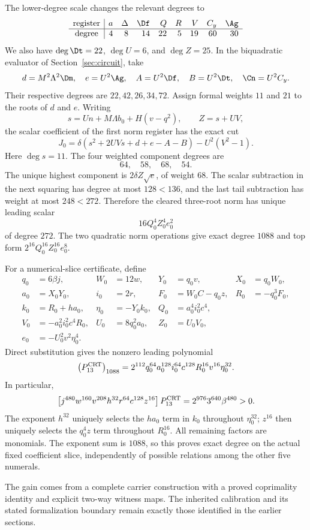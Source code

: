 The lower-degree scale changes the relevant degrees to
\[
\begin{array}{c|rrrrrrrr}
\text{register}&a&\Delta&\Df&Q&R&V&C_y&\Ag\\\hline
\text{degree}&4&8&14&22&5&19&60&30
\end{array}
\]
We also have \(\deg\Dt=22\), \(\deg U=6\), and
\(\deg Z=25\). In the biquadratic evaluator of
Section~\ref{sec:circuit}, take
\[
d=M^2\Lambda^2\Dm,\quad e=U^2\Ag,\quad
A=U^2\Df,\quad B=U^2\Dt,\quad \Cn=U^2C_y.
\]
Their respective degrees are \(22,42,26,34,72\). Assign formal
weights \(11\) and \(21\) to the roots of \(d\) and \(e\).
Writing
\[
s=Un+M\Lambda b_0+H(v-q^2),\qquad Z=s+UV,
\]
the scalar coefficient of the first norm register has the exact cut
\begin{equation}
J_0=\delta(s^2+2UVs+d+e-A-B)-U^2(V^2-1).
\label{eq:crtcut}
\end{equation}
Here \(\deg s=11\). The four weighted component degrees are
\[
64,\quad58,\quad68,\quad54.
\]
The unique highest component is \(2\delta Z\sqrt e\), of
weight \(68\). The scalar subtraction in the next squaring has
degree at most \(128<136\), and the last tail subtraction has
weight at most \(248<272\). Therefore the cleared three-root
norm has unique leading scalar
\[
16Q_0^4Z_0^4e_0^2
\]
of degree \(272\). The two quadratic norm operations give exact
degree \(1088\) and top form \(2^{16}Q_0^{16}Z_0^{16}e_0^8\).

For a numerical-slice certificate, define
\begin{align*}
q_0&=6\beta j,&W_0&=12w,&Y_0&=q_0v,&X_0&=q_0W_0,\\
a_0&=X_0Y_0,&i_0&=2r,&F_0&=W_0C-q_0z,&R_0&=-q_0^3F_0,\\
k_0&=R_0+ha_0,&\eta_0&=-Y_0k_0,&Q_0&=a_0^4i_0^2c^4,\\
V_0&=-a_0^2i_0^2c^4R_0,&U_0&=8q_0^2a_0,&Z_0&=U_0V_0,\\
e_0&=-U_0^2v^2\eta_0^4.&&&&
\end{align*}
Direct substitution gives the nonzero leading polynomial
\begin{equation}
\bigl(P_{13}^{\rm CRT}\bigr)_{1088}
=2^{112}q_0^{64}a_0^{128}i_0^{64}c^{128}
 R_0^{16}v^{16}\eta_0^{32}.
\label{eq:crttop}
\end{equation}
In particular,
\begin{equation}
\left[j^{480}w^{160}v^{208}h^{32}r^{64}c^{128}z^{16}\right]
P_{13}^{\rm CRT}
=2^{976}3^{640}\beta^{480}>0.
\label{eq:crtcoefficient}
\end{equation}
The exponent \(h^{32}\) uniquely selects the \(ha_0\) term in
\(k_0\) throughout \(\eta_0^{32}\); \(z^{16}\) then uniquely
selects the \(q_0^4z\) term throughout \(R_0^{16}\).
All remaining factors are monomials. The exponent sum is \(1088\),
so this proves exact degree on the actual fixed coefficient slice,
independently of possible relations among the other five numerals.

The gain comes from a complete carrier construction with a proved
coprimality identity and explicit two-way witness maps. The inherited calibration and its stated formalization boundary remain
exactly those identified in the earlier sections.
